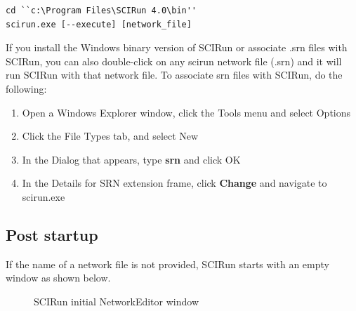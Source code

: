 \documentclass[fleqn,12pt,openany]{book}
\begin{document}
\begin{verbatim}
cd ``c:\Program Files\SCIRun 4.0\bin''
scirun.exe [--execute] [network_file]
\end{verbatim}

If you install the Windows binary version of SCIRun or associate .srn files with SCIRun, you can also double-click on any scirun
network file (.srn) and it will run SCIRun with that network file.
To associate srn files with SCIRun, do the following:

\begin{enumerate}
\item Open a Windows Explorer window, click the Tools menu and select Options
\item Click the File Types tab, and select New
\item In the Dialog that appears, type \textbf{srn} and click OK
\item In the Details for SRN extension frame, click \textbf{Change} and navigate to scirun.exe
\end{enumerate}

\subsection{Post startup}

If the name of a network file is not provided, SCIRun starts with an empty window as shown below.

\begin{figure}[ht]
\begin{centering}
\caption{SCIRun initial NetworkEditor window}
\end{centering}
\end{figure}
\end{document}

